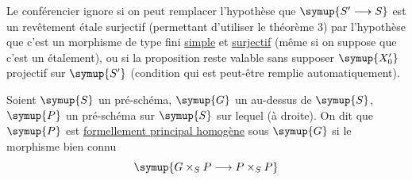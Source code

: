  Le conférencier ignore si on peut remplacer l'hypothèse
que $\symup{S'\longrightarrow S}$ est un revêtement étale surjectif (permettant
d'utiliser le théorème 3) par l'hypothèse que c'est un morphisme de type fini
\uline{simple} et \uline{surjectif} (même si on suppose que c'est un étalement), ou si la
proposition reste valable sans supposer $\symup{X'_0}$ projectif sur $\symup{S'}$ (condition qui
est peut-être remplie automatiquement).

 Soient $\symup{S}$ un pré-schéma, $\symup{G}$ un  au-dessus de $\symup{S}$,
$\symup{P}$ un pré-schéma sur $\symup{S}$ sur lequel  (à droite). On dit que $\symup{P}$
est \uline{formellement principal homogène} sous $\symup{G}$ si le morphisme bien connu
\[
  \symup{G\times_SP\longrightarrow P\times_SP}
\]

